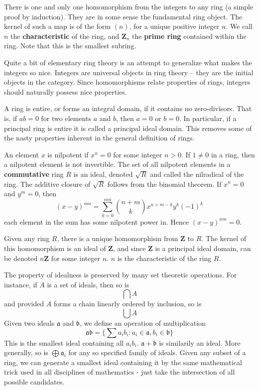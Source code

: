There is one and only one homomorphism from the integers to any ring (a simple proof by induction). They are in some sense the fundamental ring object. The kernel of such a map is of the form $(n)$, for a unique positive integer $n$. We call $n$ the {\bf characteristic} of the ring, and $\mathbf{Z}_n$ the {\bf prime ring} contained within the ring. Note that this is the smallest subring.

Quite a bit of elementary ring theory is an attempt to generalize what makes the integers so nice. Integers are universal objects in ring theory -- they are the initial objects in the category. Since homomorphisms relate properties of rings, integers should naturally possess nice properties.

A ring is entire, or forms an integral domain, if it contains no zero-divisors. That is, if $ab = 0$ for two elements $a$ and $b$, then $a = 0$ or $b = 0$. In particular, if a principal ring is entire it is called a principal ideal domain. This removes some of the nasty properties inherent in the general definition of rings.

An element $x$ is nilpotent if $x^n = 0$ for some integer $n > 0$. If $1 \neq 0$ in a ring, then a nilpotent element is not invertible. The set of all nilpotent elements in a {\bf commutative} ring $R$ is an ideal, denoted $\sqrt{R}$ and called the nilradical of the ring. The additive closure of $\sqrt{R}$ follows from the binomial theorem. If $x^n = 0$ and $y^m = 0$, then
%
\[ (x - y)^{nm} = \sum_{k = 0}^{nm} \binom{n + m}{k} x^{n + m - k}y^k (-1)^k \]
%
each element in the sum has some nilpotent power in. Hence $(x - y)^{nm} = 0$.

Given any ring $R$, there is a unique homomorphism from $\mathbf{Z}$ to $R$. The kernel of this homomorphism is an ideal of $\mathbf{Z}$, and since $\mathbf{Z}$ is a principal ideal domain, can be denoted $n\mathbf{Z}$ for some integer $n$. $n$ is the characteristic of the ring $R$.

The property of idealness is preserved by many set theoretic operations. For instance, if $A$ is a set of ideals, then so is
%
\[ \bigcap A \]
%
and provided $A$ forms a chain linearly ordered by inclusion, so is
%
\[ \bigcup A \]
%
Given two ideals $\mathfrak{a}$ and $\mathfrak{b}$, we define an operation of multiplication
%
\[ \mathfrak{a} \mathfrak{b} = \{ \sum a_i b_i : a_i \in \mathfrak{a}, b_i \in \mathfrak{b} \} \]
%
This is the smallest ideal containing all $a_i b_i$. $\mathfrak{a} + \mathfrak{b}$ is similarily an ideal. More generally, so is $\bigoplus \mathfrak{a}_i$ for any so specified family of ideals. Given any subset of a ring, we can generate a smallest ideal containing it by the same mathematical trick used in all disciplines of mathematics - just take the intersection of all possible candidates.

